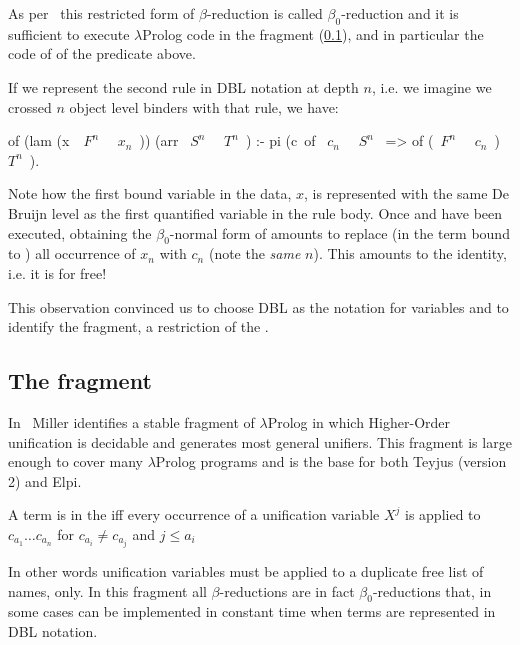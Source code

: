 \documentclass[a4paper, 11pt]{book}
\begin{document}
\noindent
As per~\cite{10.1093/logcom/1.4.497} this restricted form of $\beta$-reduction
is called $\beta_0$-reduction and it is sufficient to execute $\lambda$Prolog
code in the \theotherfragment fragment (\cref{sec:llam}), and in particular the code of
of the  predicate above.

If we represent the second rule in DBL notation at depth $n$, i.e.
we imagine we crossed $n$ object level binders with that rule, we have:

\begin{elpicode}
of (lam (x\ ~$F^n$~ ~$x_n$~)) (arr ~$S^n$~ ~$T^n$~) :-
  pi (c\ of ~$c_n$~ ~$S^n$~ => of (~$F^n$~ ~$c_n$~) ~$T^n$~).
\end{elpicode}

\noindent
Note how the first bound variable in the data, $x$, is represented with
the same De Bruijn level as the first  quantified variable in
the rule body. Once  and \elpi{=>} have been executed,
obtaining the $\beta_0$-normal form of  amounts to
replace (in the term bound to ) all occurrence of $x_n$ with
$c_n$ (note the \emph{same} $n$). This amounts to the identity, i.e. it
is for free!

This observation convinced us to choose DBL as the notation for variables
and to identify the \thefragment fragment, a restriction of the \theotherfragment.

\subsection{The \theotherfragment fragment}\label{sec:llam}

In~\cite{10.1093/logcom/1.4.497} Miller identifies a stable fragment of
$\lambda$Prolog in which Higher-Order unification is decidable and
generates most general unifiers. This fragment is large enough to cover
many $\lambda$Prolog programs and is the base for both Teyjus (version 2)
and Elpi.

\begin{definition}
A term is in the \theotherfragment
iff every occurrence of a unification variable $X^j$ is applied to
$c_{a_1} \ldots c_{a_n}$ for $c_{a_i} \not= c_{a_j}$ and $j \leq a_i$
\end{definition}

\noindent
In other words unification variables must be applied to a duplicate free
list of names, only.
In this fragment all $\beta$-reductions are in fact $\beta_0$-reductions
that, in some cases can be implemented in constant time when terms are
represented in DBL notation.
\end{document}
